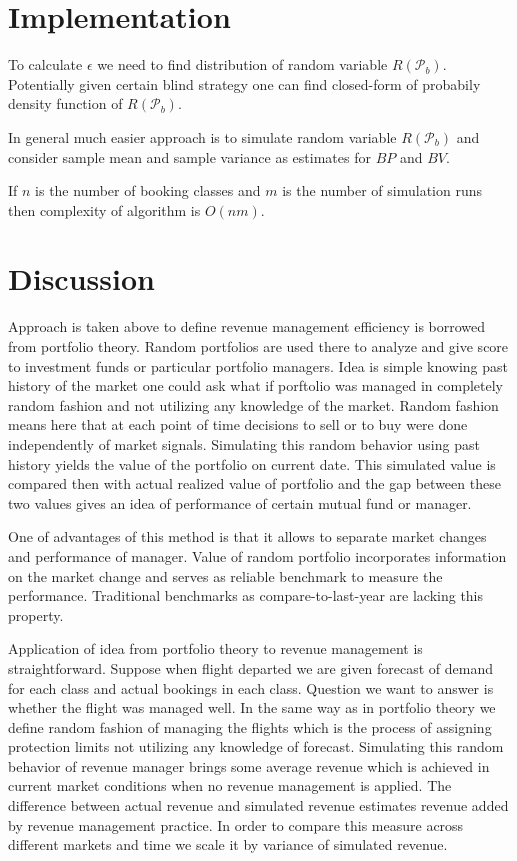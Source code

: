 \documentclass[a4paper,oneside]{article}
\begin{document}
  \section{Implementation}
  To calculate $\epsilon$ we need to find distribution of random variable
  $R(\mathcal{P}_b)$. Potentially given certain blind strategy one can
  find closed-form of probabily density function of $R(\mathcal{P}_b)$.

  In general much easier approach is to simulate random variable
  $R(\mathcal{P}_b)$ and consider sample mean and sample variance as 
  estimates for $BP$ and $BV$. 

  If $n$ is the number of booking classes and $m$ is the number of simulation runs
  then complexity of algorithm is $O(nm)$.

  \section{Discussion}

  Approach is taken above to define revenue management efficiency is borrowed
  from portfolio theory. Random portfolios are used there to analyze and give score
  to investment funds or particular portfolio managers. Idea is simple knowing past
  history of the market one could ask what if porftolio was managed in completely 
  random fashion and not utilizing any knowledge of the market. Random fashion means
  here that at each point of time decisions to sell or to buy were done independently
  of market signals. Simulating this random behavior using past history yields the 
  value of the portfolio on current date. This simulated value is compared then with
  actual realized value of portfolio and the gap between these two values gives an idea
  of performance of certain mutual fund or manager.

  One of advantages of this method is that it allows to separate market changes and
  performance of manager. Value of random portfolio incorporates information on 
  the market change and serves as reliable benchmark to measure the performance.
  Traditional benchmarks as compare-to-last-year are lacking this property.

  Application of idea from portfolio theory to revenue management is straightforward.
  Suppose when flight departed we are given forecast of demand for each class and
  actual bookings in each class. Question we want to answer is whether the flight was 
  managed well. In the same way as in portfolio theory we define random fashion of 
  managing the flights which is the process of assigning protection limits not 
  utilizing any knowledge of forecast. Simulating this random behavior of revenue
  manager brings some average revenue which is achieved in current market conditions
  when no revenue management is applied. The difference between actual revenue and 
  simulated revenue estimates revenue added by revenue management practice. In order
  to compare this measure across different markets and time we scale it by variance 
  of simulated revenue.   
\end{document}
